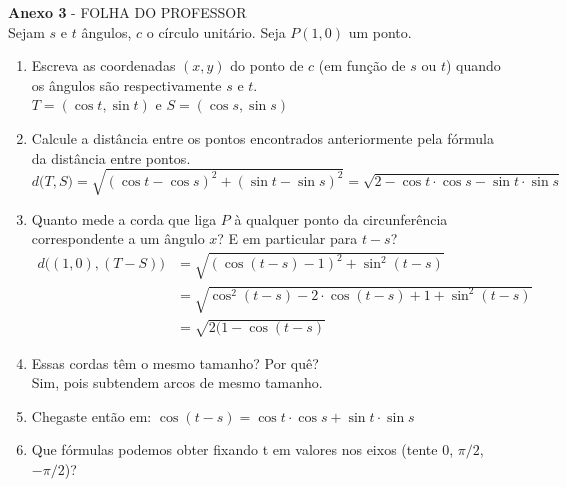 \documentclass[english,ngerman,parskip=half]{scrartcl}
\begin{document}
\textbf{Anexo 3} - FOLHA DO PROFESSOR \\
Sejam $s$ e $t$ ângulos, $c$ o círculo unitário. Seja $P(1,0)$ um ponto. 
\begin{enumerate}[label=\textnormal{(\arabic*)}]

    \item Escreva as coordenadas $(x,y)$ do ponto de $c$ (em função de $s$ ou $t$) quando os ângulos são respectivamente $s$ e $t$.\\
        $T = (\cos t, \sin t)$ e $S = (\cos s, \sin s)$
    \item Calcule a distância entre os pontos encontrados anteriormente pela fórmula da distância entre pontos.
        $$d\Big(T,S\Big) = \sqrt{(\cos t - \cos s)^2 + (\sin t - \sin s)^2} =
        \sqrt{2 - \cos t \cdot \cos s - \sin t \cdot \sin s}
        $$
    \item Quanto mede a corda que liga $P$ à qualquer ponto da circunferência correspondente a um ângulo $x$? E em particular para $t-s$?
        \begin{align*}
             d \Big( (1,0), (T-S) \Big) &= \sqrt{ (\cos(t-s)-1)^2 + \sin^2(t-s) } \\
                                      &= \sqrt{\cos^2(t-s) - 2\cdot \cos(t-s) + 1 + \sin^2(t-s)} \\
                                      &= \sqrt{2(1 - \cos(t-s)} 
        \end{align*}
    \item Essas cordas têm o mesmo tamanho? Por quê? \\
        Sim, pois subtendem arcos de mesmo tamanho.
    \item Chegaste então em: $\cos (t-s) = \cos t \cdot \cos s + \sin t \cdot \sin s$
    \item Que fórmulas podemos obter fixando t em valores nos eixos (tente $0$, $\pi/2$, $-\pi/2$)?
\end{enumerate}
\end{document}
